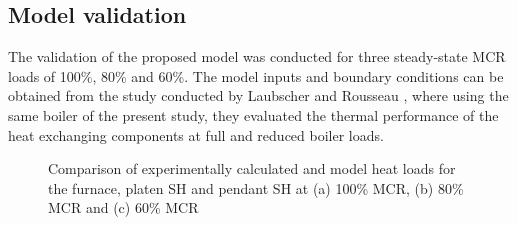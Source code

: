 \documentclass[review]{elsarticle}
\begin{document}
\subsection{Model validation}

The validation of the proposed model was conducted for three steady-state MCR loads of 100\%, 80\% and 60\%. The model inputs and boundary conditions can be obtained from the study conducted by Laubscher and Rousseau \citep{Laubscher2019b}, where using the same boiler of the present study, they evaluated the thermal performance of the heat exchanging components at full and reduced boiler loads.

\begin{figure}[h!]
\caption{Comparison of experimentally calculated and model heat loads for the furnace, platen SH and pendant SH at (a) 100\% MCR, (b) 80\% MCR and (c) 60\% MCR}
\label{fig_heat_valid}
\end{figure}
\end{document}
